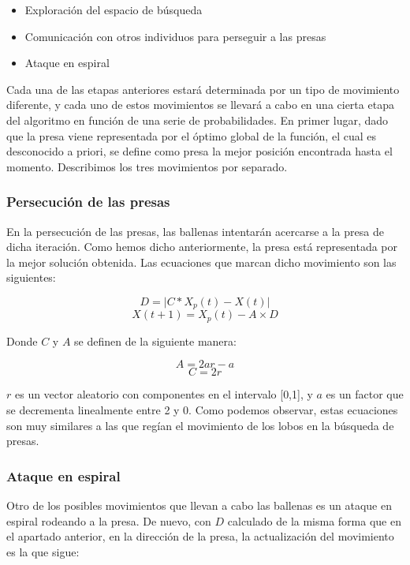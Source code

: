 \documentclass[
  a4paper,
,tablecaptionabove
]{scrartcl}
\providecommand{\tightlist}{%
  \setlength{\itemsep}{0pt}\setlength{\parskip}{0pt}}
\begin{document}
\begin{itemize}
\tightlist
\item
  Exploración del espacio de búsqueda
\item
  Comunicación con otros individuos para perseguir a las presas
\item
  Ataque en espiral
\end{itemize}

Cada una de las etapas anteriores estará determinada por un tipo de
movimiento diferente, y cada uno de estos movimientos se llevará a cabo
en una cierta etapa del algoritmo en función de una serie de
probabilidades. En primer lugar, dado que la presa viene representada
por el óptimo global de la función, el cual es desconocido a priori, se
define como presa la mejor posición encontrada hasta el momento.
Describimos los tres movimientos por separado.

\hypertarget{persecuciuxf3n-de-las-presas}{%
\subsubsection{Persecución de las
presas}\label{persecuciuxf3n-de-las-presas}}

En la persecución de las presas, las ballenas intentarán acercarse a la
presa de dicha iteración. Como hemos dicho anteriormente, la presa está
representada por la mejor solución obtenida. Las ecuaciones que marcan
dicho movimiento son las siguientes:

\[ D = \lvert C*X_p(t) - X(t) \rvert \]
\[ X(t+1) = X_p(t) - A \times D \]

Donde \(C\) y \(A\) se definen de la siguiente manera:

\[ A = 2 a r - a \] \[ C = 2 r \]

\(r\) es un vector aleatorio con componentes en el intervalo {[}0,1{]},
y \(a\) es un factor que se decrementa linealmente entre 2 y 0. Como
podemos observar, estas ecuaciones son muy similares a las que regían el
movimiento de los lobos en la búsqueda de presas.

\hypertarget{ataque-en-espiral}{%
\subsubsection{Ataque en espiral}\label{ataque-en-espiral}}

Otro de los posibles movimientos que llevan a cabo las ballenas es un
ataque en espiral rodeando a la presa. De nuevo, con \(D\) calculado de
la misma forma que en el apartado anterior, en la dirección de la presa,
la actualización del movimiento es la que sigue:
\end{document}
